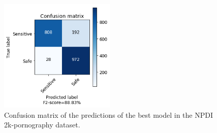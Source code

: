 \begin{figure}[!ht]
    \centering
    \includegraphics[width=0.49\textwidth]{img/results/MLP-2K-TEST.png}
    \caption{Confusion matrix of the predictions of the best model in the NPDI 2k-pornography dataset.}
    \label{fig:cf-test-2k}
\end{figure}


